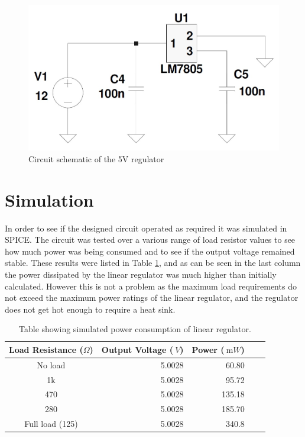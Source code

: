 \begin{figure}
    \centering
    \includegraphics[width = 0.45\linewidth]{Figures/linearreg.jpg}
    \caption{Circuit schematic of the 5V regulator}
    \label{fig:5vregulator}
\end{figure}

\section{Simulation} \label{sec:simulation_linear}
In order to see if the designed circuit operated as required it was simulated in SPICE. The circuit was tested over a various range of load resistor values to see how much power was being consumed and to see if the output voltage remained stable.\newline
These results were listed in Table \ref{tab:linearregtable}, and as can be seen in the last column the power dissipated by the linear regulator was much higher than initially calculated. However this is not a problem as the maximum load requirements do not exceed the maximum power ratings of the linear regulator, and the regulator does not get hot enough to require a heat sink.

\begin{table}
        \centering
        \footnotesize
        \caption{Table showing simulated power consumption of linear regulator.}
         \begin{tabular}{c@{\qquad}rrrr}
          \toprule
           Load Resistance ($\Omega$) & Output Voltage ($\SI{}{V}$) & Power ($\SI{}{\milli W}$) \\
           \midrule
            No load     & 5.0028     & 60.80  \\
            1k          & 5.0028     & 95.72  \\
            470         & 5.0028     & 135.18  \\
            280         & 5.0028     & 185.70 \\
            Full load (125) & 5.0028 & 340.8 \\
          \bottomrule
        \end{tabular}
     \label{tab:linearregtable}
\end{table}

